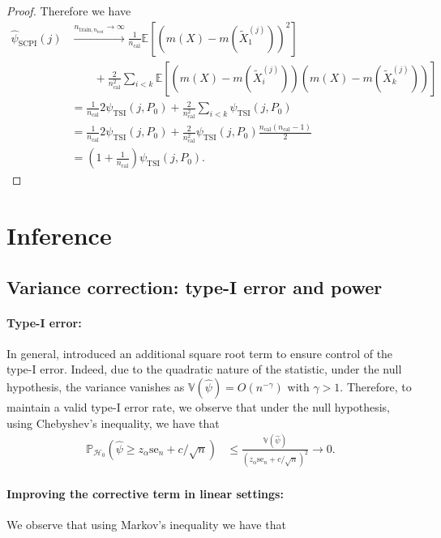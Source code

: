 \documentclass{article}
\theoremstyle{plain}
\theoremstyle{definition}
\theoremstyle{remark}
\newcommand{\e}[1]{\mathbb{E}\left[#1\right]  } %
\begin{document}
\begin{proof}
Therefore we have 
\begin{align*}
    \widehat{\psi}_\mathrm{SCPI}(j)&\xrightarrow{n_{\mathrm{train}, n_{\mathrm{test}}} \to \infty}\frac{1}{n_{\mathrm{cal}}}\e{(m(X)-m(\widetilde{X}^{(j)}_1))^2}\\&\qquad+\frac{2}{n_{\mathrm{cal}}^2}\sum_{i<k}\e{(m(X)-m(\widetilde{X}^{(j)}_i))(m(X)-m(\widetilde{X}^{(j)}_k))}\\
    &=\frac{1}{n_{\mathrm{cal}}}2\psi_\mathrm{TSI}(j, P_0)+\frac{2}{n_{\mathrm{cal}}^2}\sum_{i<k}\psi_\mathrm{TSI}(j, P_0)\\
    &=\frac{1}{n_{\mathrm{cal}}}2\psi_\mathrm{TSI}(j, P_0)+\frac{2}{n_{\mathrm{cal}}^2}\psi_\mathrm{TSI}(j, P_0)\frac{n_{\mathrm{cal}}(n_{\mathrm{cal}}-1)}{2}\\
    &=\left(1+\frac{1}{n_{\mathrm{cal}}}\right)\psi_\mathrm{TSI}(j, P_0).
\end{align*}

\end{proof}

\section{Inference}

\subsection{Variance correction: type-I error and power}\label{app:inf_lin}
\paragraph{Type-I error:}In general, \citet{locoVSShapley} introduced an additional square root term to ensure control of the type-I error. Indeed, due to the quadratic nature of the statistic, under the null hypothesis, the variance vanishes as $\mathbb{V}(\widehat{\psi}) = O(n^{-\gamma})$ with $\gamma > 1$. Therefore, to maintain a valid type-I error rate, we observe that under the null hypothesis, using Chebyshev's inequality, we have that
\begin{align*}
    \mathbb{P}_{\mathcal{H}_0}\left(\widehat{\psi}\geq z_\alpha \mathrm{se}_n+c/\sqrt{n}\right)&\leq \frac{\mathbb{V}(\widehat{\psi})}{\left(z_\alpha \mathrm{se}_n+c/\sqrt{n}\right)^2}\to 0.
\end{align*}

\paragraph{Improving the corrective term in linear settings:}We observe that using Markov's inequality we have that 
\end{document}
